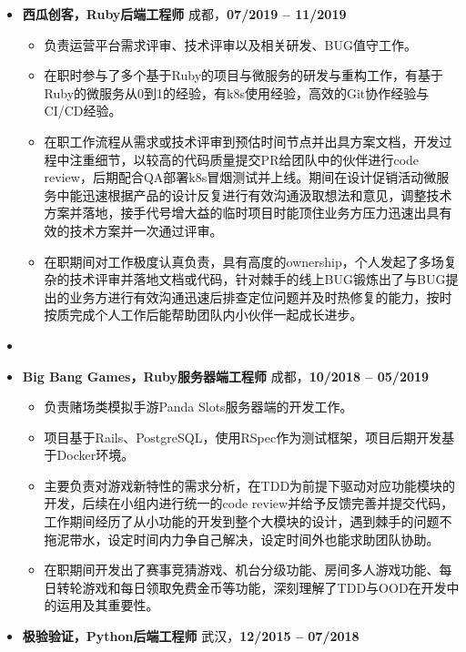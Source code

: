 \documentclass[11pt, a4paper,sans]{moderncv}   %
\begin{document}
\begin{itemize}
\item{\yahei \textbf{西瓜创客，Ruby后端工程师} \hfill 成都，\textbf{07/2019 -- 11/2019}}
\begin{itemize}\yahei
  \item 负责运营平台需求评审、技术评审以及相关研发、BUG值守工作。
  \item 在职时参与了多个基于Ruby的项目与微服务的研发与重构工作，有基于Ruby的微服务从0到1的经验，有k8s使用经验，高效的Git协作经验与CI/CD经验。
  \item 在职工作流程从需求或技术评审到预估时间节点并出具方案文档，开发过程中注重细节，以较高的代码质量提交PR给团队中的伙伴进行code review，后期配合QA部署k8s冒烟测试并上线。期间在设计促销活动微服务中能迅速根据产品的设计反复进行有效沟通汲取想法和意见，调整技术方案并落地，接手代号增大益的临时项目时能顶住业务方压力迅速出具有效的技术方案并一次通过评审。
  \item 在职期间对工作极度认真负责，具有高度的ownership，个人发起了多场复杂的技术评审并落地文档或代码，针对棘手的线上BUG锻炼出了与BUG提出的业务方进行有效沟通迅速后排查定位问题并及时热修复的能力，按时按质完成个人工作后能帮助团队内小伙伴一起成长进步。
  \end{itemize}

  \vspace{6pt}
\item
  \item{\yahei \textbf{Big Bang Games，Ruby服务器端工程师} \hfill 成都，\textbf{10/2018 -- 05/2019}}
  \begin{itemize}\yahei
    \item 负责赌场类模拟手游Panda Slots服务器端的开发工作。
    \item 项目基于Rails、PostgreSQL，使用RSpec作为测试框架，项目后期开发基于Docker环境。
    \item 主要负责对游戏新特性的需求分析，在TDD为前提下驱动对应功能模块的开发，后续在小组内进行统一的code review并给予反馈完善并提交代码，工作期间经历了从小功能的开发到整个大模块的设计，遇到棘手的问题不拖泥带水，设定时间内力争自己解决，设定时间外也能求助团队协助。
    \item 在职期间开发出了赛事竞猜游戏、机台分级功能、房间多人游戏功能、每日转轮游戏和每日领取免费金币等功能，深刻理解了TDD与OOD在开发中的运用及其重要性。
  \end{itemize}

  \vspace{6pt}

  \item{\yahei \textbf{极验验证，Python后端工程师} \hfill 武汉，\textbf{12/2015 -- 07/2018}}


\end{itemize}
\end{document}
